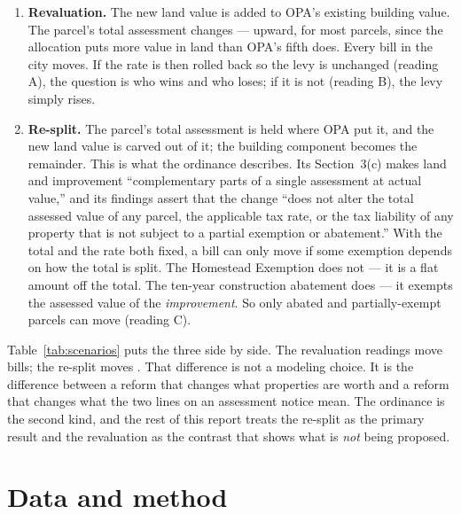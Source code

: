 \documentclass[11pt]{article}
\begin{document}
\begin{enumerate}
\item \textbf{Revaluation.} The new land value is added to OPA's existing building value. The
  parcel's total assessment changes --- upward, for most parcels, since the allocation puts more
  value in land than OPA's fifth does. Every bill in the city moves. If the rate is then rolled
  back so the levy is unchanged (reading A), the question is who wins and who loses; if it is
  not (reading B), the levy simply rises.
\item \textbf{Re-split.} The parcel's total assessment is held where OPA put it, and the new
  land value is carved out of it; the building component becomes the remainder. This is what
  the ordinance describes. Its Section~3(c) makes land and improvement ``complementary parts of
  a single assessment at actual value,'' and its findings assert that the change ``does not
  alter the total assessed value of any parcel, the applicable tax rate, or the tax liability of
  any property that is not subject to a partial exemption or abatement.'' With the total and the
  rate both fixed, a bill can only move if some exemption depends on how the total is split.
  The Homestead Exemption does not --- it is a flat amount off the total. The ten-year
  construction abatement does --- it exempts the assessed value of the \emph{improvement}. So
  only abated and partially-exempt parcels can move (reading C).
\end{enumerate}

\begin{table}[t]
  \centering
  \caption{Three readings of ``LYCD land, rates unchanged.'' Only the third is the reform the
  ordinance describes. Bills counted over the \LycdBilledParcels{} parcels with a nonzero bill
  today.}
  \label{tab:scenarios}
  
\end{table}

Table~\ref{tab:scenarios} puts the three side by side. The revaluation readings move
\LycdBilledParcels{} bills; the re-split moves \LycdCMoved{}. That difference is not a
modeling choice. It is the difference between a reform that changes what properties are worth
and a reform that changes what the two lines on an assessment notice mean. The ordinance is
the second kind, and the rest of this report treats the re-split as the primary result and
the revaluation as the contrast that shows what is \emph{not} being proposed.

\section{Data and method}
\end{document}
